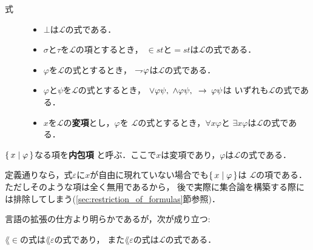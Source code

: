 	\begin{description}
		\item[式] 
			\begin{itemize}
				\item $\bot$は$\mathcal{L}$の式である．
				\item $\sigma$と$\tau$を$\mathcal{L}$の項とするとき，
					$\in st$と$=st$は$\mathcal{L}$の式である．
				\item $\varphi$を$\mathcal{L}$の式とするとき，
					$\rightharpoondown\hspace{-0.25em} \varphi$は$\mathcal{L}$の式である．
				\item $\varphi$と$\psi$を$\mathcal{L}$の式とするとき，
					$\vee \varphi \psi,\ \wedge \varphi \psi,\ \rarrow \varphi \psi$は
					いずれも$\mathcal{L}$の式である．
				\item $x$を$\mathcal{L}$の{\bf 変項}とし，$\varphi$を
					$\mathcal{L}$の式とするとき，$\forall x \varphi$と
					$\exists x \varphi$は$\mathcal{L}$の式である．
			\end{itemize}
	\end{description}
	
	\begin{screen}
		\begin{dfn}[内包項]
			$\left\{\, x \mid \varphi\, \right\}$なる項を{\bf 内包項}
			と呼ぶ．ここで$x$は変項であり，$\varphi$は$\mathcal{L}$の式である．
		\end{dfn}
	\end{screen}
	
	定義通りなら，式$\varepsilon$に$x$が自由に現れていない場合でも$\left\{\, x \mid \varphi\, \right\}$は
	$\mathcal{L}$の項である．ただしそのような項は全く無用であるから，
	後で実際に集合論を構築する際には排除してしまう(\ref{sec:restriction_of_formulas}節参照)．
	
	言語の拡張の仕方より明らかであるが，次が成り立つ:
	
	\begin{screen}
		\begin{metathm}
			$\lang{\in}$の式は$\lang{\varepsilon}$の式であり，
			また$\lang{\varepsilon}$の式は$\mathcal{L}$の式である．
		\end{metathm}
	\end{screen}
	
